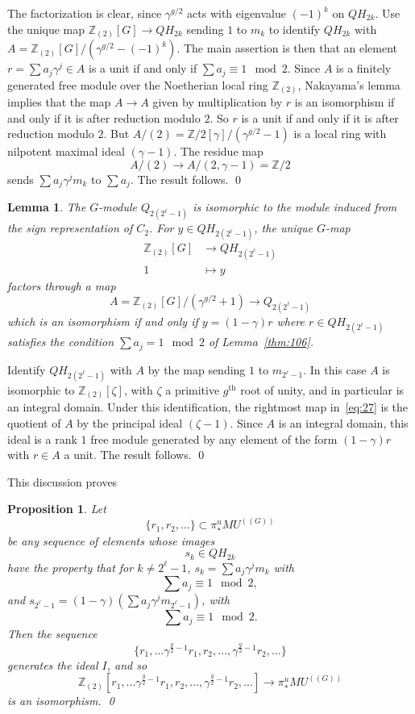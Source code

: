 \documentclass{amsart}
\newtheorem{lem}[equation]{Lemma}
\newtheorem{prop}[equation]{Proposition}
\theoremstyle{definition}
\theoremstyle{remark}
\newenvironment{pf}{\bigskip{\em Proof:\/}}{\qed\medskip}
\newcommand{\Z}{{\mathbb Z}}
\newcommand{\mutn}[1]{MU^{(\!(#1)\!)}}
\newcommand{\piu}{\pi^{u}}
\newcommand{\mm}{m}
\newcommand{\zlt}{\Z_{(2)}}
\newcommand{\zt}{C_{2}}
\begin{document}
\begin{pf}
The factorization is clear, since $\gamma^{g/2}$ acts with eigenvalue
$(-1)^{k}$ on $QH_{2k}$.  Use the unique map $\Z_{(2)}[G]\to QH_{2k}$
sending $1$ to $\mm_{k}$ to identify $QH_{2k}$ with
$A=\Z_{(2)}[G]/(\gamma^{g/2}-(-1)^{k})$.  The main assertion is then
that an element $r=\sum a_{j}\gamma^{j}\in A$ is a unit if and only if
$\sum a_{j}\equiv 1\mod 2$.  Since $A$ is a finitely generated free
module over the Noetherian local ring $\Z_{(2)}$, Nakayama's lemma
implies that the map $A\to A$ given by multiplication by $r$ is an
isomorphism if and only if it is after reduction modulo $2$.  So $r$
is a unit if and only if it is after reduction modulo $2$.  But
$A/(2)=\Z/2[\gamma]/(\gamma^{g/2}-1)$ is a local ring with nilpotent
maximal ideal $(\gamma-1)$.  The residue map
\[
A/(2)\to A/(2,\gamma-1)=\Z/2
\]
sends $\sum a_{j}\gamma^{j}\mm_{k}$ to $\sum a_{j}$.  The result follows.
\end{pf}

\begin{lem}
The $G$-module $Q_{2(2^{\ell}-1)}$ is isomorphic to the module induced
from the sign representation of $\zt$.  For $y\in QH_{2(2^{\ell}-1)}$,
the unique $G$-map
\begin{align*}
\zlt[G] &\to QH_{2(2^{\ell}-1)} \\
1 &\mapsto y
\end{align*}
factors through a map
\[
A=\zlt[G]/(\gamma^{g/2}+1)\to Q_{2(2^{\ell}-1)}
\]
which is an isomorphism if and only if $y=(1-\gamma)r$ where $r\in
QH_{2(2^{\ell}-1)}$ satisfies the condition $\sum a_{j}=1\mod 2$ of
Lemma~\ref{thm:106}.
\end{lem}

\begin{pf}
Identify $QH_{2(2^{\ell}-1)}$ with $A$ by the map sending $1$ to
$\mm_{2^{\ell}-1}$.  In this case $A$ is isomorphic to
$\Z_{(2)}[\zeta]$, with $\zeta$ a primitive $g^{\text{th}}$ root
of unity, and in particular is an integral domain.  Under this
identification, the rightmost map in~\eqref{eq:27} is the quotient of
$A$ by the principal ideal $(\zeta-1)$.  Since $A$ is an integral
domain, this ideal is a rank $1$ free module generated by any element
of the form $(1-\gamma)r$ with $r\in A$ a unit.  The result follows.
\end{pf}




This discussion proves
\begin{prop}
\label{thm:31}
Let
\[
\{r_{1},r_{2},\dots \}\subset\piu_{\ast}\mutn{G}
\]
be any sequence of elements whose images 
\[
s_{k}\in QH_{2k}
\]
have the property that for $k\ne 2^{\ell}-1$, $s_{k}=  \sum a_{j}\gamma^{j}\mm_{k}$
with
\[
\sum a_{j}\equiv 1\mod 2,
\]
and $s_{2^{\ell}-1}= (1-\gamma)\left(\sum a_{j}\gamma^{j}\mm_{2^{\ell}-1} \right)$, with
\[
\sum a_{j}\equiv 1\mod 2.
\]
Then the sequence
\[
\{r_{1},\dots \gamma^{\frac{g}{2}-1}r_{1},r_{2},\dots,\gamma^{\frac{g}{2}-1}r_{2},\dots \}
\]
generates the ideal $I$, and so
\[
\zlt[r_{1},\dots
\gamma^{\frac{g}{2}-1}r_{1},r_{2},\dots,\gamma^{\frac{g}{2}-1}r_{2},\dots]\to
\piu_{\ast}\mutn{G}
\]
is an isomorphism.
\qed
\end{prop}
\end{document}
